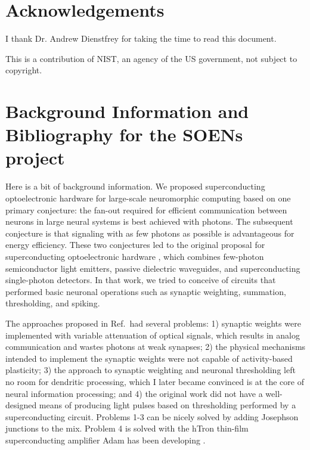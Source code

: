 \documentclass[]{article}
\newcommand{\onlinecite}[1]{\hspace{-1 ex} \nocite{#1}\citenum{#1}}
\begin{document}
\section{Acknowledgements}
I thank Dr. Andrew Dienstfrey for taking the time to read this document.

\vspace{0.5em}
\noindent This is a contribution of NIST, an agency of the US government, not subject to copyright.
	
\appendix

\section{\label{apx:background}Background Information and Bibliography for the SOENs project}
Here is a bit of background information. We proposed superconducting optoelectronic hardware for large-scale neuromorphic computing based on one primary conjecture: the fan-out required for efficient communication between neurons in large neural systems is best achieved with photons. The subsequent conjecture is that signaling with as few photons as possible is advantageous for energy efficiency. These two conjectures led to the original proposal for superconducting optoelectronic hardware \cite{shbu2017}, which combines few-photon semiconductor light emitters, passive dielectric waveguides, and superconducting single-photon detectors. In that work, we tried to conceive of circuits that performed basic neuronal operations such as synaptic weighting, summation, thresholding, and spiking. 

The approaches proposed in Ref.\,\onlinecite{shbu2017} had several problems: 1) synaptic weights were implemented with variable attenuation of optical signals, which results in analog communication and wastes photons at weak synapses; 2) the physical mechanisms intended to implement the synaptic weights were not capable of activity-based plasticity; 3) the approach to synaptic weighting and neuronal thresholding left no room for dendritic processing, which I later became convinced is at the core of neural information processing; and 4) the original work did not have a well-designed means of producing light pulses based on thresholding performed by a superconducting circuit. Problems 1-3 can be nicely solved by adding Josephson junctions to the mix. Problem 4 is solved with the hTron thin-film superconducting amplifier Adam has been developing \cite{mcve2019}. 
\end{document}
